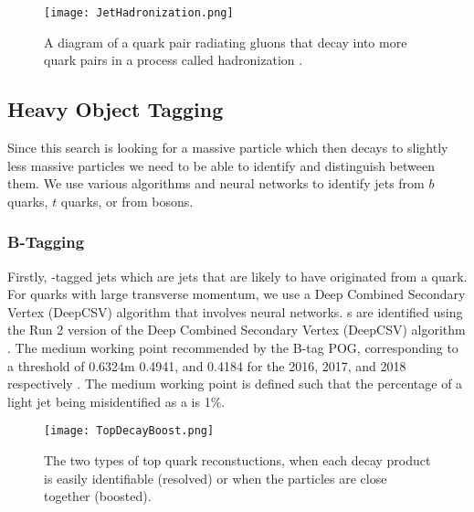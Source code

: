 \begin{figure}
 	\centering
	\texttt{[image: JetHadronization.png]}
 	\caption[Jet Hadronization]{A diagram of a quark pair radiating gluons that decay into more quark pairs in a process called hadronization \cite{griffiths_introduction_2008}.}
 	\label{JetHadronization} 
\end{figure}

\subsection{Heavy Object Tagging}\label{HeavyObject}
Since this search is looking for a massive particle which then decays to slightly less massive particles we need to be able to identify and distinguish between them. We use various algorithms and neural networks to identify jets from $b$ quarks, $t$ quarks, or from \W {} bosons. 

\subsubsection{B-Tagging}\label{Btagging}
Firstly, \B-tagged jets which are jets that are likely to have originated from a \B{} quark. For \B{} quarks with large transverse momentum, we use a Deep Combined Secondary Vertex (DeepCSV) algorithm that involves neural networks. \bjet s{} are identified using the Run 2 version of the Deep Combined Secondary Vertex (DeepCSV) algorithm \cite{noauthor_performance_nodate}. The medium working point recommended by the B-tag POG, corresponding to a threshold of 0.6324m 0.4941, and 0.4184 for the 2016, 2017, and 2018 respectively \cite{noauthor_btagrecommendation2016legacy_nodate, noauthor_btagrecommendation94x_nodate, noauthor_btagrecommendation102x_nodate}. The medium working point is defined such that the percentage of a light jet being misidentified as a \bjet{} is 1\%.

\begin{figure}
 	\centering
	\texttt{[image: TopDecayBoost.png]}
 	\caption[Top Decays]{The two types of top quark reconstuctions, when each decay product is easily identifiable (resolved) or when the particles are close together (boosted).}
 	\label{TopDecays} 
\end{figure}


